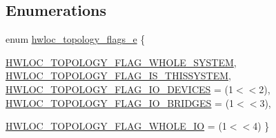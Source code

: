 \subsection*{Enumerations}
\begin{DoxyCompactItemize}
\item 
enum \hyperlink{a00044_gada025d3ec20b4b420f8038d23d6e7bde}{hwloc\_\-topology\_\-flags\_\-e} \{ \par
\hyperlink{a00044_ggada025d3ec20b4b420f8038d23d6e7bdea129b4fea1300be22bbaf0bb0958994c8}{HWLOC\_\-TOPOLOGY\_\-FLAG\_\-WHOLE\_\-SYSTEM}, 
\hyperlink{a00044_ggada025d3ec20b4b420f8038d23d6e7bdea6ecb6abc6a0bb75e81564f8bca85783b}{HWLOC\_\-TOPOLOGY\_\-FLAG\_\-IS\_\-THISSYSTEM}, 
\hyperlink{a00044_ggada025d3ec20b4b420f8038d23d6e7bdea46ae25e8896278840b1800ae9ce4de41}{HWLOC\_\-TOPOLOGY\_\-FLAG\_\-IO\_\-DEVICES} =  (1$<$$<$2), 
\hyperlink{a00044_ggada025d3ec20b4b420f8038d23d6e7bdea426b18c349f15d7046bb391d96fa947c}{HWLOC\_\-TOPOLOGY\_\-FLAG\_\-IO\_\-BRIDGES} =  (1$<$$<$3), 
\par
\hyperlink{a00044_ggada025d3ec20b4b420f8038d23d6e7bdea4a41dc181649ef81c2dcd44a54e271b9}{HWLOC\_\-TOPOLOGY\_\-FLAG\_\-WHOLE\_\-IO} =  (1$<$$<$4)
 \}
\end{DoxyCompactItemize}
